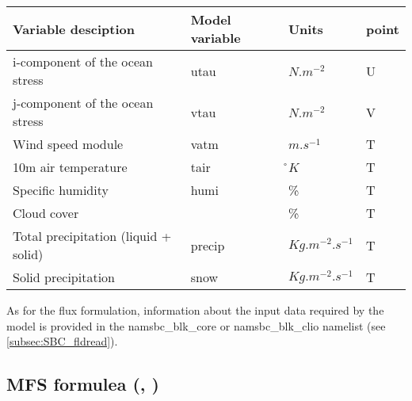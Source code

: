 \documentclass[../tex_main/NEMO_manual]{subfiles}
\begin{document}
\begin{table}[htbp]   \label{tab:CLIO}
\begin{center}
\begin{tabular}{|l|l|l|l|}
\hline
Variable desciption				& Model variable	& Units				& point \\	\hline
i-component of the ocean stress		& utau			& $N.m^{-2}$			& U \\	\hline
j-component of the ocean stress		& vtau			& $N.m^{-2}$			& V \\	\hline
Wind speed module					& vatm			& $m.s^{-1}$			& T \\	\hline
10m air temperature					& tair			& \r{}$K$				& T \\	\hline
Specific humidity						& humi			& \%					& T \\	\hline
Cloud cover							& 				& \%					& T \\	\hline
Total precipitation (liquid + solid)	& precip		& $Kg.m^{-2}.s^{-1}$	& T \\	\hline
Solid precipitation 					& snow			& $Kg.m^{-2}.s^{-1}$	& T \\	\hline
\end{tabular}
\end{center}
\end{table}

As for the flux formulation, information about the input data required by the 
model is provided in the namsbc\_blk\_core or namsbc\_blk\_clio 
namelist (see \autoref{subsec:SBC_fldread}). 

\subsection{MFS formulea (\protect{}, \protect{})}
\label{subsec:SBC_blk_mfs}
\end{document}
